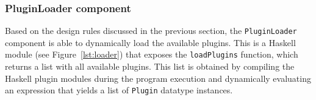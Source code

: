 
\subsubsection{PluginLoader component}

Based on the design rules discussed in the previous section, 
the \texttt{PluginLoader} component is able to dynamically 
load the available \neoidl{} plugins. This is a Haskell
module (see Figure~\ref{lst:loader}) that exposes the
\texttt{loadPlugins} function, which returns a list  with all
available plugins. This list is obtained by compiling the Haskell plugin modules 
during the program execution and dynamically evaluating an 
expression that yields a list of \texttt{Plugin} datatype instances. 

